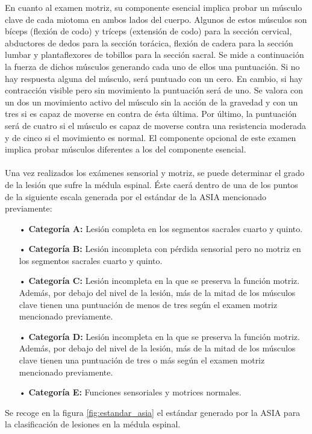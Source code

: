En cuanto al examen motriz, su componente esencial implica probar un músculo clave de cada miotoma en ambos lados del cuerpo. Algunos de estos músculos son bíceps (flexión de codo) y tríceps (extensión de codo) para la sección cervical, abductores de dedos para la sección torácica, flexión de cadera para la sección lumbar y plantaflexores de tobillos para la sección sacral. Se mide a continuación la fuerza de dichos músculos generando cada uno de ellos una puntuación. Si no hay respuesta alguna del músculo, será puntuado con un cero. En cambio, si hay contracción visible pero sin movimiento la puntuación será de uno. Se valora con un dos un movimiento activo del músculo sin la acción de la gravedad y con un tres si es capaz de moverse en contra de ésta última. Por último, la puntuación será de cuatro si el músculo es capaz de moverse contra una resistencia moderada y de cinco si el movimiento es normal. El componente opcional de este examen implica probar músculos diferentes a los del componente esencial.
\\
\\
Una vez realizados los exámenes sensorial y motriz, se puede determinar el grado de la lesión que sufre la médula espinal. Éste caerá dentro de una de los puntos de la siguiente escala generada por el estándar de la ASIA mencionado previamente:

\begin{itemize}
\item[•] \textbf{Categoría A:} Lesión completa en los segmentos sacrales cuarto y quinto.
\item[•] \textbf{Categoría B:} Lesión incompleta con pérdida sensorial pero no motriz en los segmentos sacrales cuarto y quinto.
\item[•] \textbf{Categoría C:} Lesión incompleta en la que se preserva la función motriz. Además, por debajo del nivel de la lesión, más de la mitad de los músculos clave tienen una puntuación de menos de tres según el examen motriz mencionado previamente.
\item[•] \textbf{Categoría D:} Lesión incompleta en la que se preserva la función motriz. Además, por debajo del nivel de la lesión, más de la mitad de los músculos clave tienen una puntuación de tres o más según el examen motriz mencionado previamente.
\item[•] \textbf{Categoría E:} Funciones sensoriales y motrices normales.
\end{itemize}

Se recoge en la figura \ref{fig:estandar_asia} el estándar generado por la ASIA para la clasificación de lesiones en la médula espinal.\\

